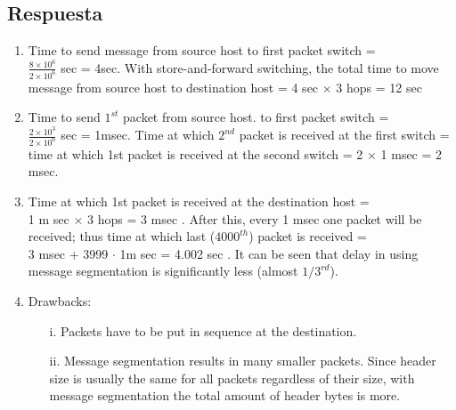 \documentclass[10pt,spanish]{article}
\numberwithin{figure}{section} %
\begin{document}
\subsection*{Respuesta}

\begin{enumerate}
\item Time to send message from source host to first packet switch =\\
$\displaystyle \frac{8 \times 10^6}{2 \times 10^6}$ sec = 4sec. With store-and-forward switching, the total time to move message from source host to destination host = 4 sec $\times$ 3 hops = 12 sec
\item Time to send $1^{st}$ packet from source host. to first packet switch =\\
$\displaystyle \frac{2 \times 10^3}{2 \times 10^6}$ sec = 1msec. Time at which $2^{nd}$ packet is received at the first switch = time at which 1st packet is received at the second switch = 2 $\times$ 1 msec = 2 msec.
\item Time at which 1st packet is received at the destination host =\\
1 m sec $\times$ 3 hops = 3 msec . After this, every 1 msec one packet will be received; thus time at which last ($4000^{th}$) packet is received =\\
3 msec + 3999 $\cdot$ 1m sec = 4.002 sec . It can be seen that delay in using message segmentation is significantly less (almost $1/3^{rd}$).
\item Drawbacks:
\begin{enumerate}
\item[i.] Packets have to be put in sequence at the destination.
\item[ii.] Message segmentation results in many smaller packets. Since header size is usually the same for all packets regardless of their size, with message segmentation the total amount of header bytes is more.
\end{enumerate}
\end{enumerate}
\end{document}

